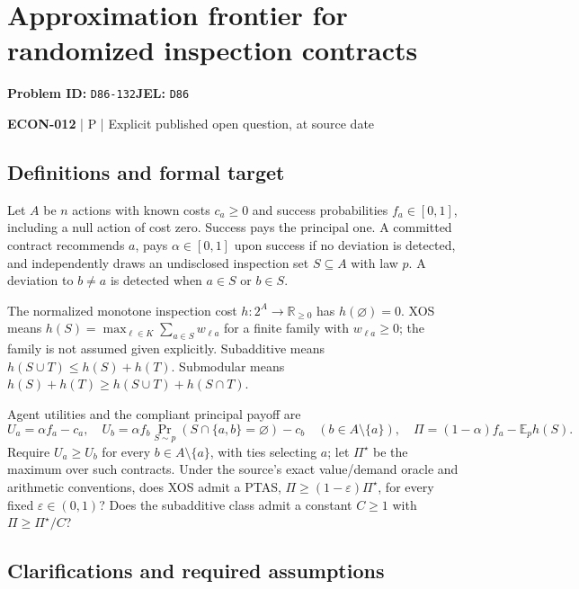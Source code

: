 \documentclass[11pt,a4paper]{article}
\begin{document}
\section*{Approximation frontier for randomized inspection contracts}
\textbf{Problem ID:} \texttt{D86-132}\quad \textbf{JEL:} \texttt{D86}\par
\label{problem:OP-0597}


\label{audited:ECON-012}

{\sffamily\small\color{muted}\textbf{ECON-012} | P | Explicit published open question, at source date\par}

\subsection*{Definitions and formal target}

Let \(A\) be \(n\) actions with known costs \(c_a\geq0\) and success probabilities \(f_a\in[0,1]\), including a null action of cost zero. Success pays the principal one. A committed contract recommends \(a\), pays \(\alpha\in[0,1]\) upon success if no deviation is detected, and independently draws an undisclosed inspection set \(S\subseteq A\) with law \(p\). A deviation to \(b\ne a\) is detected when \(a\in S\) or \(b\in S\).

The normalized monotone inspection cost \(h:2^A\to\mathbb R_{\geq0}\) has \(h(\varnothing)=0\). XOS means \(h(S)=\max_{\ell\in K}\sum_{a\in S}w_{\ell a}\) for a finite family with \(w_{\ell a}\geq0\); the family is not assumed given explicitly. Subadditive means \(h(S\cup T)\leq h(S)+h(T)\). Submodular means \(h(S)+h(T)\geq h(S\cup T)+h(S\cap T)\).

Agent utilities and the compliant principal payoff are
\[
 U_a=\alpha f_a-c_a,\quad
 U_b=\alpha f_b\Pr_{S\sim p}(S\cap\{a,b\}=\varnothing)-c_b\quad(b\in A\setminus\{a\}),\quad
 \Pi=(1-\alpha)f_a-\mathbb E_p h(S).
\]
Require \(U_a\geq U_b\) for every \(b\in A\setminus\{a\}\), with ties selecting \(a\); let \(\Pi^\star\) be the maximum over such contracts. Under the source's exact value/demand oracle and arithmetic conventions, does XOS admit a PTAS, \(\Pi\geq(1-\varepsilon)\Pi^\star\), for every fixed \(\varepsilon\in(0,1)\)? Does the subadditive class admit a constant \(C\geq1\) with \(\Pi\geq\Pi^\star/C\)?

\subsection*{Clarifications and required assumptions}
\end{document}
